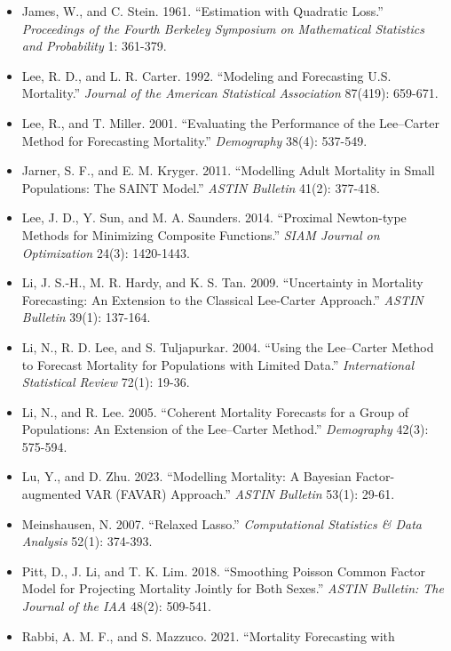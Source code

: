 \documentclass[UTF8, fontset=macnew, a4paper, 12pt]{ctexart}
\begin{document}
\begin{itemize}[leftmargin=2em, label={}, itemsep=3pt]
        \textit{Computational Statistics \& Data Analysis} 51(10): 4942-4956.
  \item[] James, W., and C. Stein. 1961. ``Estimation with Quadratic Loss.''
        \textit{Proceedings of the Fourth Berkeley Symposium on Mathematical
        Statistics and Probability} 1: 361-379.
  \item[] Lee, R. D., and L. R. Carter. 1992. ``Modeling and Forecasting U.S.
        Mortality.'' \textit{Journal of the American Statistical Association}
        87(419): 659-671.
  \item[] Lee, R., and T. Miller. 2001. ``Evaluating the Performance of the
        Lee--Carter Method for Forecasting Mortality.''
        \textit{Demography} 38(4): 537-549.
  \item[] Jarner, S. F., and E. M. Kryger. 2011. ``Modelling Adult Mortality in
        Small Populations: The SAINT Model.''
        \textit{ASTIN Bulletin} 41(2): 377-418.
  \item[] Lee, J. D., Y. Sun, and M. A. Saunders. 2014. ``Proximal Newton-type
        Methods for Minimizing Composite Functions.''
        \textit{SIAM Journal on Optimization} 24(3): 1420-1443.
  \item[] Li, J. S.-H., M. R. Hardy, and K. S. Tan. 2009. ``Uncertainty in
        Mortality Forecasting: An Extension to the Classical Lee-Carter
        Approach.'' \textit{ASTIN Bulletin} 39(1): 137-164.
  \item[] Li, N., R. D. Lee, and S. Tuljapurkar. 2004. ``Using the Lee--Carter
        Method to Forecast Mortality for Populations with Limited Data.''
        \textit{International Statistical Review} 72(1): 19-36.
  \item[] Li, N., and R. Lee. 2005. ``Coherent Mortality Forecasts for a Group
        of Populations: An Extension of the Lee--Carter Method.''
        \textit{Demography} 42(3): 575-594.
  \item[] Lu, Y., and D. Zhu. 2023. ``Modelling Mortality: A Bayesian
        Factor-augmented VAR (FAVAR) Approach.''
        \textit{ASTIN Bulletin} 53(1): 29-61.
  \item[] Meinshausen, N. 2007. ``Relaxed Lasso.''
        \textit{Computational Statistics \& Data Analysis} 52(1): 374-393.
  \item[] Pitt, D., J. Li, and T. K. Lim. 2018. ``Smoothing Poisson Common
        Factor Model for Projecting Mortality Jointly for Both Sexes.''
        \textit{ASTIN Bulletin: The Journal of the IAA} 48(2): 509-541.
  \item[] Rabbi, A. M. F., and S. Mazzuco. 2021. ``Mortality Forecasting with

\end{itemize}
\end{document}
